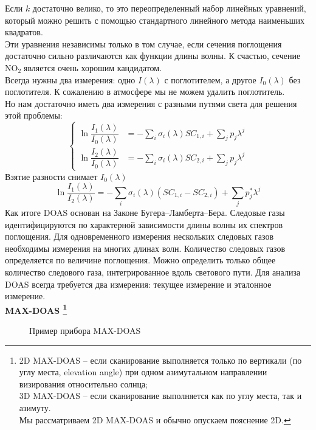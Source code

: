 \documentclass[a4paper,14pt]{article}
\theoremstyle{plain}
\theoremstyle{definition}
\theoremstyle{remark}
\newcommand{\nl}{\\ \indent}
\newcommand{\no}{$\text{NO}_2 \;$}
\begin{document}
Если $k$ достаточно велико, то это переопределенный набор
линейных уравнений, который можно решить с помощью 
стандартного линейного метода наименьших квадратов.
\nl
Эти уравнения независимы только в том случае, если сечения
поглощения достаточно сильно различаются как функции длины волны.
К счастью, сечение \no является очень хорошим кандидатом.
\nl
Всегда нужны два измерения: одно $I(\lambda)$ с поглотителем, 
а другое $I_0(\lambda)$ без поглотителя. 
К сожалению в атмосфере мы не можем удалить поглотитель.
\nl
Но нам достаточно иметь два измерения с разными путями 
света для решения этой проблемы:
\begin{equation}
\begin{cases}
\ln\dfrac{I_1(\lambda)}{I_0(\lambda)} &=
- \sum_i \sigma_i(\lambda) SC_{1, i} +
\sum_j p_j \lambda^j \\
\ln\dfrac{I_2(\lambda)}{I_0(\lambda)} &=
- \sum_i \sigma_i(\lambda) SC_{2, i} +
\sum_j p_j \lambda^j
\end{cases}
\end{equation}
Взятие разности снимает $I_0(\lambda)$
\begin{equation}
\ln \dfrac{I_1(\lambda)}{I_2(\lambda)} =
- \sum_i \sigma_i(\lambda)
(SC_{1, i} - SC_{2, i}) +
\sum_j p_j^* \lambda^j
\end{equation}
Как итоге DOAS основан на Законе Бугера--Ламберта--Бера. 
Следовые газы идентифицируются по характерной зависимости 
длины волны их спектров поглощения. 
Для одновременного измерения нескольких следовых газов 
необходимы измерения на многих длинах волн. 
Количество следовых газов определяется по величине поглощения.
Можно определить только общее количество следового газа,
интегрированное вдоль светового пути. 
Для анализа DOAS всегда требуется два измерения: текущее
измерение и эталонное измерение.
\nl
\textbf{MAX-DOAS \footnote{
2D MAX-DOAS -- если сканирование выполняется только по вертикали
(по углу места, elevation angle) при одном азимутальном
направлении визирования относительно солнца; \\
3D MAX-DOAS -- если сканирование выполняется как по углу места,
так и азимуту. \\
Мы рассматриваем 2D MAX-DOAS и обычно опускаем пояснение 2D.}} \\
\begin{figure}
\noindent{}
\caption{Пример прибора MAX-DOAS}
\label{figCurves}
\end{figure}
\end{document}
